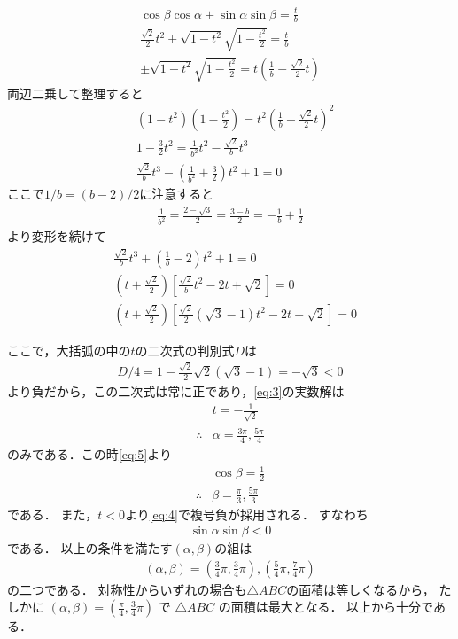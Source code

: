 \documentclass[a4paper,10pt]{ltjsarticle}
\begin{document}
\begin{multicols}{2}
\begin{align}
    \cos\beta\cos\alpha + \sin\alpha\sin\beta = \frac{t}{b}                      \\
    \frac{\sqrt{2}}{2} t^2 \pm \sqrt{1-t^2} \sqrt{1-\frac{t^2}{2}} = \frac{t}{b} \\
    \pm \sqrt{1-t^2}\sqrt{1-\frac{t^2}{2}} = t\left(\frac{1}{b}-\frac{\sqrt{2}}{2}t\right) \label{eq:4}
  \end{align}
  両辺二乗して整理すると
  \begin{align}
     & \left(1-t^2\right)\left(1-\frac{t^2}{2}\right) = t^2\left(\frac{1}{b}-\frac{\sqrt{2}}{2}t\right)^2 \\
     & 1-\frac{3}{2}t^2 = \frac{1}{b^2}t^2-\frac{\sqrt{2}}{b}t^3                                          \\
     & \frac{\sqrt{2}}{b}t^3  - \left(\frac{1}{b^2}+\frac{3}{2}\right)t^2 +1 = 0
  \end{align}
  ここで$1/b=(b-2)/2$に注意すると
  \begin{align*}
    \frac{1}{b^2} = \frac{2-\sqrt{3}}{2} = \frac{3-b}{2} = -\frac{1}{b} + \frac{1}{2}
  \end{align*}
  より変形を続けて
  \begin{align}
     & \frac{\sqrt{2}}{b}t^3 + \left(\frac{1}{b}-2\right)t^2 +1 = 0       \nonumber                                 \\
     & \left(t+\frac{\sqrt{2}}{2}\right)\left[\frac{\sqrt{2}}{b}t^2-2t+\sqrt{2}\right] = 0 \nonumber                \\
     & \left(t+\frac{\sqrt{2}}{2}\right)\left[\frac{\sqrt{2}}{2}(\sqrt{3}-1)t^2-2t+\sqrt{2}\right] = 0 \label{eq:3}
  \end{align}

  ここで，大括弧の中の$t$の二次式の判別式$D$は
  \begin{align*}
    D/4 = 1 - \frac{\sqrt{2}}{2} \sqrt{2}(\sqrt{3}-1) = -\sqrt{3} < 0
  \end{align*}
  より負だから，この二次式は常に正であり，\cref{eq:3}の実数解は
  \begin{align*}
     & t=-\frac{1}{\sqrt{2}}                   \\
    \therefore
     & \alpha = \frac{3\pi}{4}, \frac{5\pi}{4}
  \end{align*}
  のみである．この時\cref{eq:5}より
  \begin{align*}
     & \cos\beta = \frac{1}{2}              \\
    \therefore
     & \beta = \frac{\pi}{3},\frac{5\pi}{3}
  \end{align*}
  である．
  また，$t<0$より\cref{eq:4}で複号負が採用される．
  すなわち
  \begin{align*}
    \sin\alpha \sin\beta < 0
  \end{align*}
  である．
  以上の条件を満たす$(\alpha,\beta)$の組は
  \begin{align*}
    (\alpha,\beta) = (\frac{3}{4}\pi, \frac{3}{4}\pi), (\frac{5}{4}\pi, \frac{7}{4}\pi)
  \end{align*}
  の二つである．
  対称性からいずれの場合も$\triangle ABC$の面積は等しくなるから，
  たしかに $(\alpha,\beta) = (\frac{\pi}{4}, \frac{3}{4}\pi)$ で $\triangle ABC$ の面積は最大となる．
  以上から十分である．


\end{multicols}
\end{document}
